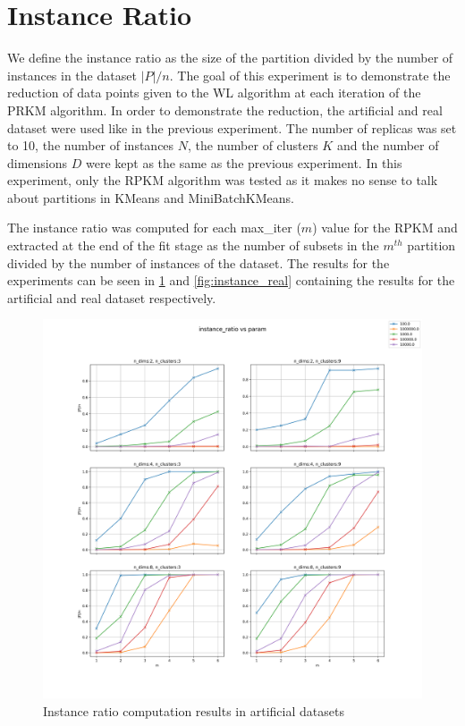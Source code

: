 \section{Instance Ratio}

We define the instance ratio as the size of the partition divided by the number of instances in the dataset $|P|/n$. The goal of this experiment is to demonstrate the reduction of data points given to the WL algorithm at each iteration of the PRKM algorithm. In order to demonstrate the reduction, the artificial and real dataset were used like in the previous experiment. The number of replicas was set to 10, the number of instances $N$, the number of clusters $K$ and the number of dimensions $D$ were kept as the same as the previous experiment. In this experiment, only the RPKM algorithm was tested as it makes no sense to talk about partitions in KMeans and MiniBatchKMeans.

The instance ratio was computed for each max\_iter ($m$) value for the RPKM and extracted at the end of the fit stage as the number of subsets in the $m^{th}$ partition divided by the number of instances of the dataset. The results for the experiments can be seen in \ref{fig:instance_art} and \ref{fig:instance_real} containing the results for the artificial and real dataset respectively.

\begin{figure}[!ht]
    \includegraphics[width=\linewidth]{images/experiments/instance_ratio_artificial.png}
    \caption{Instance ratio computation results in artificial datasets}
    \label{fig:instance_art}
\end{figure}


